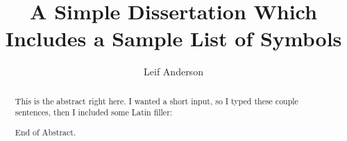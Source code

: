 \documentclass{csuthesis}
\title{A Simple Dissertation Which Includes a Sample List of Symbols}
\author{Leif Anderson}
\begin{document}
\frontmatter

% 
\begin{abstract}
This is the abstract right here. I wanted a short input, so I typed these couple sentences, then I included some Latin filler: \lipsum[1-4]

End of Abstract.
\end{abstract}

\maketitle


\tableofcontents %
\listoftables %
\end{document}
